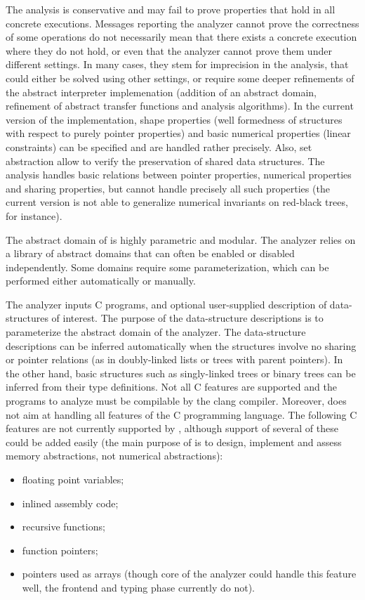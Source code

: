 The analysis is conservative and may fail to prove properties that hold
in all concrete executions.
Messages reporting the analyzer cannot prove the correctness of some
operations do not necessarily mean that there exists a concrete execution
where they do not hold, or even that the analyzer cannot prove them under
different settings.
In many cases, they stem for imprecision in the analysis, that could either
be solved using other settings, or require some deeper refinements of the
abstract interpreter implemenation (addition of an abstract domain,
refinement of abstract transfer functions and analysis algorithms).
In the current version of the \memcad implementation, shape properties
(well formedness of structures with respect to purely pointer properties)
and basic numerical properties (linear constraints) can be specified and
are handled rather precisely.
Also, set abstraction allow to verify the preservation of shared
data structures.
The analysis handles basic relations between pointer properties, numerical
properties and sharing properties, but cannot handle precisely all such
properties (the current version is not able to generalize numerical
invariants on red-black trees, for instance).

The abstract domain of \memcad is highly parametric and modular.
The analyzer relies on a library of abstract domains that can often
be enabled or disabled independently.
Some domains require some parameterization, which can be performed
either automatically or manually.

The \memcad analyzer inputs C programs, and optional user-supplied
description of data-structures of interest.
The purpose of the data-structure descriptions is to parameterize the
abstract domain of the analyzer.
The data-structure descriptions can be inferred automatically when the
structures involve no sharing or pointer relations (as in doubly-linked
lists or trees with parent pointers).
In the other hand, basic structures such as singly-linked trees or
binary trees can be inferred from their type definitions.
Not all C features are supported and the programs to analyze must be
compilable by the clang compiler.
Moreover, \memcad does not aim at handling all features of the C
programming language.
The following C features are not currently supported by \memcad,
although support of several of these could be added easily (the
main purpose of \memcad is to design, implement and
assess memory abstractions, not numerical abstractions):
\begin{itemize}
\item floating point variables;
\item inlined assembly code;
\item recursive functions;
\item function pointers;
\item pointers used as arrays (though core of the analyzer could
  handle this feature well, the frontend and typing phase currently
  do not).
\end{itemize}

